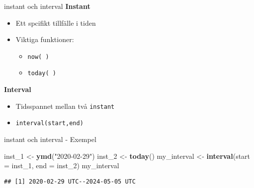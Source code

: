 \documentclass[
  11pt,
  ignorenonframetext,
  handout]{beamer}
\newenvironment{Shaded}{\begin{snugshade}}{\end{snugshade}}
\newcommand{\AttributeTok}[1]{\textcolor[rgb]{0.13,0.29,0.53}{#1}}
\newcommand{\FunctionTok}[1]{\textcolor[rgb]{0.13,0.29,0.53}{\textbf{#1}}}
\newcommand{\NormalTok}[1]{#1}
\newcommand{\OtherTok}[1]{\textcolor[rgb]{0.56,0.35,0.01}{#1}}
\newcommand{\StringTok}[1]{\textcolor[rgb]{0.31,0.60,0.02}{#1}}
\providecommand{\tightlist}{%
  \setlength{\itemsep}{0pt}\setlength{\parskip}{0pt}}
\begin{document}
\begin{frame}{instant och interval}
\label{instant-och-interval}
\textbf{Instant}

\begin{itemize}
\tightlist
\item
  Ett spcifikt tillfälle i tiden
\item
  Viktiga funktioner:

  \begin{itemize}
  \tightlist
  \item
    \texttt{now( )}
  \item
    \texttt{today( )}
  \end{itemize}
\end{itemize}

\textbf{Interval}

\begin{itemize}
\tightlist
\item
  Tidsspannet mellan två \texttt{instant}
\item
  \texttt{interval(start,end)}
\end{itemize}
\end{frame}

\begin{frame}[fragile]{instant och interval - Exempel}
\label{instant-och-interval---exempel}
\begin{Shaded}
\begin{Highlighting}[]
\NormalTok{inst\_1 }\OtherTok{\textless{}{-}} \FunctionTok{ymd}\NormalTok{(}\StringTok{"2020{-}02{-}29"}\NormalTok{)}
\NormalTok{inst\_2 }\OtherTok{\textless{}{-}} \FunctionTok{today}\NormalTok{()}
\NormalTok{my\_interval }\OtherTok{\textless{}{-}} \FunctionTok{interval}\NormalTok{(}\AttributeTok{start =}\NormalTok{ inst\_1, }\AttributeTok{end =}\NormalTok{ inst\_2)}
\NormalTok{my\_interval}
\end{Highlighting}
\end{Shaded}

\begin{verbatim}
## [1] 2020-02-29 UTC--2024-05-05 UTC
\end{verbatim}
\end{frame}
\end{document}
